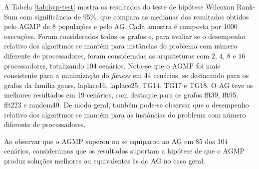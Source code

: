 \documentclass[fleqn,10pt]{SelfArx} %
\begin{document}
A Tabela \ref{tab:hyp-test} mostra os resultados do teste de hipótese Wilcoxon Rank-Sum com significância de 95\%, que compara as medianas dos resultados obtidos pelo AGMP de 8 populações e pelo AG. Cada amostra é composta por $1000$ execuções. Foram considerados todos os grafos e, para avaliar se o desempenho relativo dos algoritmos se mantém para instâncias do problema com número diferente de processadores, foram consideradas as arquiteturas com $2$, $4$, $8$ e $16$ processadores, totalizando 104 cenários. Nota-se que o AGMP foi mais consistente para a minimização do \textit{fitness} em 44 cenários, se destacando para os grafos da família gauss, laplace16, laplace25, TG14, TG17 e TG18. O AG teve os melhores resultados em 19 cenários, com destaque para os grafos fft39, fft95, fft223 e random40. De modo geral, também pode-se observar que o desempenho relativo dos algoritmos se mantém para as instâncias do problema com número diferente de processadores.

Ao observar que o AGMP superou ou se equiparou ao AG em 85 dos 104 cenários, consideramos que os resultados suportam a hipótese de que o AGMP produz soluções melhores ou equivalentes às do AG no caso geral.

\end{document}
